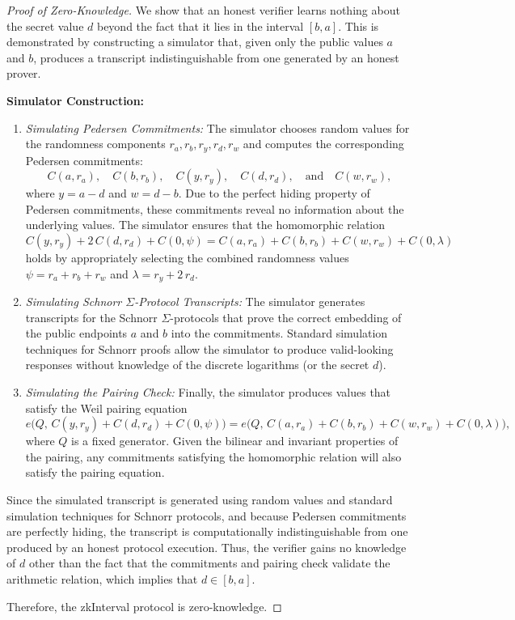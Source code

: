 \documentclass{iacrcc}
\theoremstyle{definition}
\begin{document}
\begin{proof}[Proof of Zero-Knowledge]
  We show that an honest verifier learns nothing about the secret value \( d \) beyond the fact that it lies in the interval \([b, a]\). This is demonstrated by constructing a simulator that, given only the public values \(a\) and \(b\), produces a transcript indistinguishable from one generated by an honest prover.
  
  \textbf{Simulator Construction:}
  \begin{enumerate}
      \item \emph{Simulating Pedersen Commitments:}  
      The simulator chooses random values for the randomness components \(r_a, r_b, r_y, r_d, r_w\) and computes the corresponding Pedersen commitments:
      \[
      C(a, r_a), \quad C(b, r_b), \quad C(y, r_y), \quad C(d, r_d), \quad \text{and} \quad C(w, r_w),
      \]
      where \(y = a - d\) and \(w = d - b\). Due to the perfect hiding property of Pedersen commitments, these commitments reveal no information about the underlying values. The simulator ensures that the homomorphic relation
      \[
      C(y, r_y) + 2\,C(d, r_d) + C(0, \psi) = C(a, r_a) + C(b, r_b) + C(w, r_w) + C(0, \lambda)
      \]
      holds by appropriately selecting the combined randomness values \(\psi = r_a + r_b + r_w\) and \(\lambda = r_y + 2\,r_d\).
      
      \item \emph{Simulating Schnorr \(\Sigma\)-Protocol Transcripts:}  
      The simulator generates transcripts for the Schnorr \(\Sigma\)-protocols that prove the correct embedding of the public endpoints \(a\) and \(b\) into the commitments. Standard simulation techniques for Schnorr proofs allow the simulator to produce valid-looking responses without knowledge of the discrete logarithms (or the secret \(d\)).
      
      \item \emph{Simulating the Pairing Check:}  
      Finally, the simulator produces values that satisfy the Weil pairing equation
      \[
      e\Big(Q,\, C(y, r_y) + C(d, r_d) + C(0, \psi)\Big) = e\Big(Q,\, C(a, r_a) + C(b, r_b) + C(w, r_w) + C(0, \lambda)\Big),
      \]
      where \(Q\) is a fixed generator. Given the bilinear and invariant properties of the pairing, any commitments satisfying the homomorphic relation will also satisfy the pairing equation.
  \end{enumerate}
  
  Since the simulated transcript is generated using random values and standard simulation techniques for Schnorr protocols, and because Pedersen commitments are perfectly hiding, the transcript is computationally indistinguishable from one produced by an honest protocol execution. Thus, the verifier gains no knowledge of \( d \) other than the fact that the commitments and pairing check validate the arithmetic relation, which implies that \( d \in [b, a] \).
  
  Therefore, the zkInterval protocol is zero-knowledge.
\end{proof}
\end{document}
